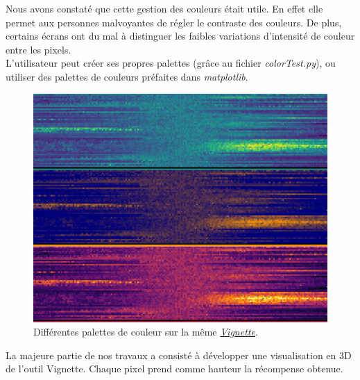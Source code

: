 \documentclass[12pt]{article}
\begin{document}
Nous avons constaté que cette gestion des couleurs était utile. En effet elle permet aux personnes malvoyantes de régler le contraste des couleurs. De plus, certains écrans ont du mal à distinguer les faibles variations d'intensité de couleur entre les pixels. \\

L'utilisateur peut créer ses propres palettes (grâce au fichier \emph{colorTest.py}), ou utiliser des palettes de couleurs préfaites dans \emph{matplotlib}. \\

\begin{figure}[htp]
    \centering
    \includegraphics[width=15cm]{Images/palette}
    \caption{Différentes palettes de couleur sur la même \hyperref[fig:vignettePendulum]{\emph{Vignette}}.}
    \label{fig:palette}
\end{figure}

La majeure partie de nos travaux a consisté à développer une visualisation en 3D de l'outil Vignette. Chaque pixel prend comme hauteur la récompense obtenue. \\
\end{document}

